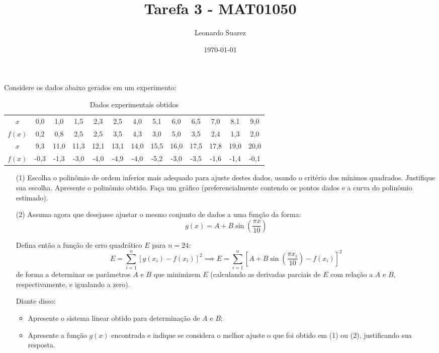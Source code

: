 \documentclass{article}
\title{Tarefa 3 - MAT01050}
\author{Leonardo Suarez}
\date{\today}
\begin{document}
\maketitle

\begin{unprblm}
    Considere os dados abaixo gerados em um experimento:
    \begin{table}[h!]
    \centering
    \caption{Dados experimentais obtidos}
    \begin{tabular}{ccccccccccccc}
    \toprule
    $x$    & 0,0 & 1,0 & 1,5 & 2,3 & 2,5 & 4,0 & 5,1 & 6,0 & 6,5 & 7,0 & 8,1 & 9,0 \\
    $f(x)$ & 0,2 & 0,8 & 2,5 & 2,5 & 3,5 & 4,3 & 3,0 & 5,0 & 3,5 & 2,4 & 1,3 & 2,0 \\
    \midrule
    $x$    & 9,3 & 11,0 & 11,3 & 12,1 & 13,1 & 14,0 & 15,5 & 16,0 & 17,5 & 17,8 & 19,0 & 20,0 \\
    $f(x)$ & -0,3 & -1,3 & -3,0 & -4,0 & -4,9 & -4,0 & -5,2 & -3,0 & -3,5 & -1,6 & -1,4 & -0,1 \\
    \bottomrule
    \end{tabular}
    \end{table}

    \begin{itemize}
        \item [(1)] Escolha o polinômio de ordem inferior mais adequado para ajuste destes dados, usando o critério dos mínimos quadrados. Justifique sua escolha. Apresente o polinômio obtido. Faça um gráfico (preferencialmente contendo os pontos dados e a curva do polinômio estimado).
        \item [(2)] Assuma agora que desejasse ajustar o mesmo conjunto de dados a uma função da forma:
        \begin{equation}
            g(x) = A + B \sin\left(\frac{\pi x}{10}\right)
        \end{equation}

        Defina então a função de erro quadrático $E$ para $n = 24$:
        \begin{equation}
            E = \sum_{i=1}^{n} [g(x_i) - f(x_i)]^2 \implies E = \sum_{i=1}^{n} \left[ A + B \sin\left(\frac{\pi x_i}{10}\right) - f(x_i) \right]^2
        \end{equation} de forma a determinar os parâmetros $A$ e $B$ que minimizem $E$ (calculando as derivadas parciais de $E$ com relação a $A$ e $B$, respectivamente, e igualando a zero).

        Diante disso:
        \begin{itemize}
            \item Apresente o sistema linear obtido para determinação de $A$ e $B$;
            \item Apresente a função $g(x)$ encontrada e indique se considera o melhor ajuste o que foi obtido em (1) ou (2), justificando sua resposta.
        \end{itemize}
    \end{itemize}    
\end{unprblm}
\end{document}
